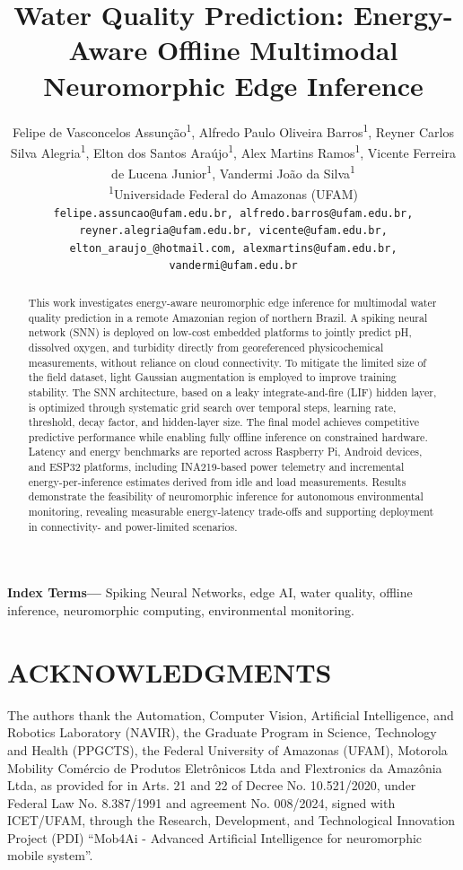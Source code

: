 \documentclass[twoside]{article}
\title{
	Water Quality Prediction: Energy-Aware Offline Multimodal Neuromorphic Edge Inference
}
\author{%
	Felipe de Vasconcelos Assunção\textsuperscript{1},
	Alfredo Paulo Oliveira Barros\textsuperscript{1},
	Reyner Carlos Silva Alegria\textsuperscript{1},
	Elton dos Santos Araújo\textsuperscript{1},
	Alex Martins Ramos\textsuperscript{1},
	Vicente Ferreira de Lucena Junior\textsuperscript{1},
	Vandermi João da Silva\textsuperscript{1}\\[2mm]
	\textsuperscript{1}Universidade Federal do Amazonas (UFAM)\\[1mm]
	\texttt{felipe.assuncao@ufam.edu.br, alfredo.barros@ufam.edu.br,}\\
	\texttt{reyner.alegria@ufam.edu.br, vicente@ufam.edu.br,}\\
	\texttt{elton\_araujo\_@hotmail.com, alexmartins@ufam.edu.br,}\\
	\texttt{vandermi@ufam.edu.br}%
}
\date{}
\makeatletter
\renewcommand{\maketitle}{%
  \begin{center}
    {\fontsize{24pt}{10pt}\selectfont\bfseries \@title\par}%
    \vspace{1em}
    {\large \@author\par}%
    \vspace{1em}
  \end{center}
}
\makeatother
\begin{document}
\maketitle
\thispagestyle{fancy}


\begin{abstract}
\noindent
This work investigates energy-aware neuromorphic edge inference for multimodal water quality prediction in a remote Amazonian region of northern Brazil. A spiking neural network (SNN) is deployed on low-cost embedded platforms to jointly predict pH, dissolved oxygen, and turbidity directly from georeferenced physicochemical measurements, without reliance on cloud connectivity. To mitigate the limited size of the field dataset, light Gaussian augmentation is employed to improve training stability. The SNN architecture, based on a leaky integrate-and-fire (LIF) hidden layer, is optimized through systematic grid search over temporal steps, learning rate, threshold, decay factor, and hidden-layer size. The final model achieves competitive predictive performance while enabling fully offline inference on constrained hardware. Latency and energy benchmarks are reported across Raspberry Pi, Android devices, and ESP32 platforms, including INA219-based power telemetry and incremental energy-per-inference estimates derived from idle and load measurements. Results demonstrate the feasibility of neuromorphic inference for autonomous environmental monitoring, revealing measurable energy-latency trade-offs and supporting deployment in connectivity- and power-limited scenarios.
\end{abstract}

\noindent\textbf{Index Terms—} Spiking Neural Networks, edge AI, water quality, offline inference, neuromorphic computing, environmental monitoring.

\FloatBarrier








\section*{ACKNOWLEDGMENTS}
The authors thank the Automation, Computer Vision, Artificial Intelligence, and Robotics
Laboratory (NAVIR), the Graduate Program in Science, Technology and Health (PPGCTS), the Federal
University of Amazonas (UFAM), Motorola Mobility Comércio de Produtos Eletrônicos Ltda and
Flextronics da Amazônia Ltda, as provided for in Arts. 21 and 22 of Decree No. 10.521/2020, under
Federal Law No. 8.387/1991 and agreement No. 008/2024, signed with ICET/UFAM, through the
Research, Development, and Technological Innovation Project (PDI) “Mob4Ai - Advanced Artificial
Intelligence for neuromorphic mobile system”.



\end{document}
